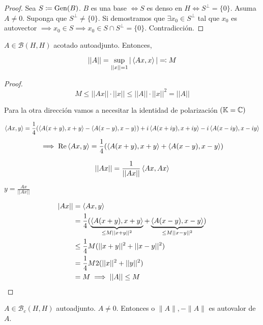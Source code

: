 \begin{proof}
   Sea $S\coloneqq \operatorname{Gen}(B)$. $B$ es una base $\iff S$ es denso en $H\iff S^\perp=\{0\}$. Asuma $A\neq 0$. Suponga que $S^\perp\neq \{0\}$. Si demostramos que $\exists x_0\in S^\perp$ tal que $x_0$ es autovector $\implies x_0\in S\implies x_0\in S\cap S^\perp=\{0\}$. Contradicción.
\end{proof}

\begin{flemma}
   $A\in \mathcal{B}(H,H)$ acotado autoadjunto. Entonces,

   \[||A||=\sup_{||x||=1}|\left\langle Ax,x\right\rangle|\eqqcolon M\]
\end{flemma}

\begin{proof}
   \[M\leq ||Ax||\cdot||x||\leq ||A||\cdot||x||^2=||A||\]

   Para la otra dirección vamos a necesitar la identidad de polarización $(\mathbb{K}=\mathbb{C})$

   \[\left\langle Ax,y\right\rangle=\frac{1}{4}(\left\langle A(x+y),x+y\right\rangle-\left\langle A(x-y),x-y\right\rangle)+i\left\langle A(x+iy),x+iy\right\rangle-i\left\langle A(x-iy),x-iy\right\rangle\]
   \[\implies \operatorname{Re} \left\langle Ax,y\right\rangle=\frac{1}{4}(\left\langle A(x+y),x+y\right\rangle+\left\langle A(x-y),x-y\right\rangle)\]

   \begin{align*}
      ||Ax||=\frac{1}{||Ax||}\left\langle Ax,Ax\right\rangle
   \end{align*}

   $y=\frac{Ax}{||Ax||}$

   \begin{align*}
      |Ax||&=\left\langle Ax,y\right\rangle\\
      &=\frac{1}{4}(\underbrace{\left\langle A(x+y),x+y\right\rangle}_{\leq M||x+y||^2}+\underbrace{\left\langle A(x-y),x-y\right\rangle}_{\leq M||x-y||^2})\\
      &\leq \frac{1}{4}M(||x+y||^2+||x-y||^2)\\
      &=\frac{1}{4}M2(||x||^2+||y||^2)\\
      &=M\implies ||A||\leq M
   \end{align*}
\end{proof}

\begin{flemma}
   $A\in\mathcal{B}_c(H,H)$ autoadjunto. $A\neq 0$. Entonces o $\|A\|,-\|A\|$ es autovalor de $A$.
\end{flemma}